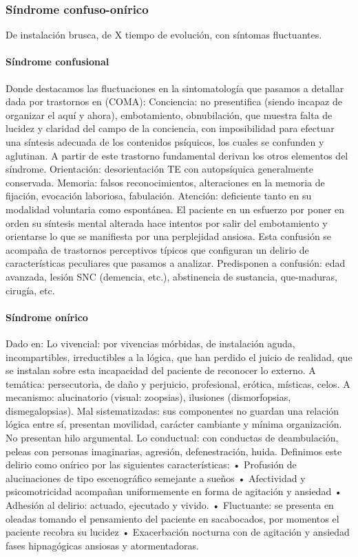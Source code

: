 \documentclass{scrbook}
\begin{document}
\subsubsection*{Síndrome confuso-onírico}
De instalación brusca, de X tiempo de evolución, con síntomas fluctuantes.
\paragraph{Síndrome confusional}
Donde destacamos las fluctuaciones en la sintomatología que pasamos a detallar dada por trastornos en (COMA): Conciencia: no presentifica (siendo incapaz de organizar el aquí y ahora), embotamiento, obnubilación, que muestra falta de lucidez y claridad del campo de la conciencia, con imposibilidad para efectuar una síntesis adecuada de los contenidos psíquicos, los cuales se confunden y aglutinan. A partir de este trastorno fundamental derivan los otros elementos del síndrome. Orientación: desorientación TE con autopsíquica generalmente conservada. Memoria: falsos reconocimientos, alteraciones en la memoria de fijación, evocación laboriosa, fabulación. Atención: deficiente tanto en su modalidad voluntaria como espontánea. El paciente en un esfuerzo por poner en orden su síntesis mental alterada hace intentos por salir del embotamiento y orientarse lo que se manifiesta por una perplejidad ansiosa. Esta confusión se acompaña de trastornos perceptivos típicos que configuran un delirio de características peculiares que pasamos a analizar. Predisponen a confusión: edad avanzada, lesión SNC (demencia, etc.), abstinencia de sustancia, que-maduras, cirugía, etc.
\paragraph{Síndrome onírico}
Dado en: Lo vivencial: por vivencias mórbidas, de instalación aguda, incompartibles, irreductibles a la lógica, que han perdido el juicio de realidad, que se instalan sobre esta incapacidad del paciente de reconocer lo externo. A temática: persecutoria, de daño y perjuicio, profesional, erótica, místicas, celos. A mecanismo: alucinatorio (visual: zoopsias), ilusiones (dismorfopsias, dismegalopsias). Mal sistematizadas: sus componentes no guardan una relación lógica entre sí, presentan movilidad, carácter cambiante y mínima organización. No presentan hilo argumental. Lo conductual: con conductas de deambulación, peleas con personas imaginarias, agresión, defenestración, huida. Definimos este delirio como onírico por las siguientes características: • Profusión de alucinaciones de tipo escenográfico semejante a sueños • Afectividad y psicomotricidad acompañan uniformemente en forma de agitación y ansiedad • Adhesión al delirio: actuado, ejecutado y vivido. • Fluctuante: se presenta en oleadas tomando el pensamiento del paciente en sacabocados, por momentos el paciente recobra su lucidez • Exacerbación nocturna con de agitación y ansiedad fases hipnagógicas ansiosas y atormentadoras.
\end{document}
